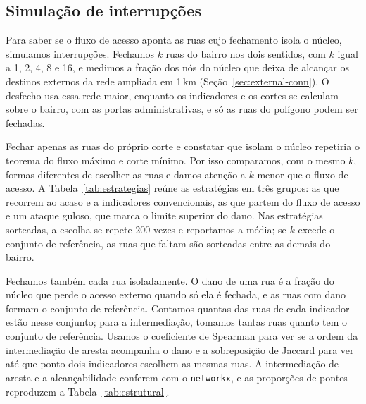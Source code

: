 \subsection{Simulação de interrupções}
\label{sec:sim-method}

Para saber se o fluxo de acesso aponta as ruas cujo fechamento isola o
núcleo, simulamos interrupções. Fechamos $k$ ruas do bairro nos dois
sentidos, com $k$ igual a 1, 2, 4, 8 e 16, e medimos a fração dos nós do
núcleo que deixa de alcançar os destinos externos da rede ampliada em
1\,km (Seção~\ref{sec:external-conn}). O desfecho usa essa rede maior,
enquanto os indicadores e os cortes se calculam sobre o bairro, com as
portas administrativas, e só as ruas do polígono podem ser fechadas.

Fechar apenas as ruas do próprio corte e constatar que isolam o núcleo
repetiria o teorema do fluxo máximo e corte mínimo. Por isso comparamos,
com o mesmo $k$, formas diferentes de escolher as ruas e damos atenção a
$k$ menor que o fluxo de acesso. A Tabela~\ref{tab:estrategias} reúne as
estratégias em três grupos: as que recorrem ao acaso e a indicadores
convencionais, as que partem do fluxo de acesso e um ataque guloso, que
marca o limite superior do dano. Nas estratégias sorteadas, a escolha se
repete 200 vezes e reportamos a média; se $k$ excede o conjunto de
referência, as ruas que faltam são sorteadas entre as demais do bairro.

Fechamos também cada rua isoladamente. O dano de uma rua é a fração do
núcleo que perde o acesso externo quando só ela é fechada, e as ruas com
dano formam o conjunto de referência. Contamos quantas das ruas de cada
indicador estão nesse conjunto; para a intermediação, tomamos tantas ruas
quanto tem o conjunto de referência. Usamos o coeficiente de Spearman para
ver se a ordem da intermediação de aresta acompanha o dano e a sobreposição
de Jaccard para ver até que ponto dois indicadores escolhem as mesmas ruas.
A intermediação de aresta e a alcançabilidade conferem com o
\texttt{networkx}, e as proporções de pontes reproduzem a
Tabela~\ref{tab:estrutural}.

